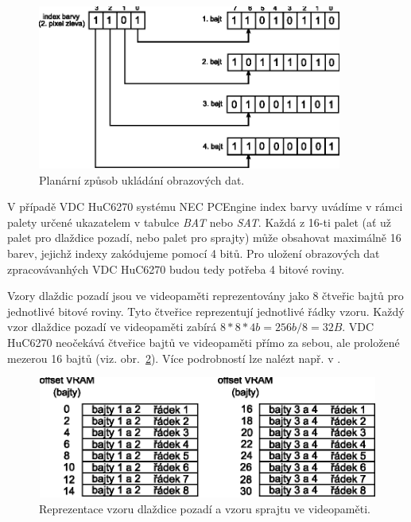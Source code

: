 \begin{figure}[ht]
\begin{center}
\includegraphics[width=10cm,height=5.4cm]{fig/pce_planar}
\caption{Planární způsob ukládání obrazových dat.\label{fig:vdc_planar}}
\end{center}
\end{figure}

V případě VDC HuC6270 systému NEC PCEngine index barvy uvádíme v rámci palety
určené ukazatelem v tabulce {\it BAT} nebo {\it SAT}. Každá z 16-ti palet (ať
už palet pro dlaždice pozadí, nebo palet pro sprajty) může obsahovat maximálně
16 barev, jejichž indexy zakódujeme pomocí 4 bitů. Pro uložení obrazových dat
zpracovávanhých VDC HuC6270 budou tedy potřeba 4 bitové roviny.

Vzory dlaždic pozadí jsou ve videopaměti reprezentovány jako 8 čtveřic bajtů
pro jednotlivé bitové roviny. Tyto čtveřice reprezentují jednotlivé řádky
vzoru. Každý vzor dlaždice pozadí ve videopaměti zabírá $8 * 8 * 4b = 256b / 8
= 32B$. VDC HuC6270 neočekává čtveřice bajtů ve videopaměti přímo za sebou, ale
proložené mezerou 16 bajtů (viz. obr.~\ref{fig:vdc_pat}). Více podrobností
lze nalézt např. v \cite{MacDonald02}.

\begin{figure}[ht]
\begin{center}
\includegraphics[width=11.5cm,height=4cm]{fig/pce_pixel}
\caption{Reprezentace vzoru dlaždice pozadí a vzoru sprajtu ve
videopaměti.\label{fig:vdc_pat}}
\end{center}
\end{figure}

